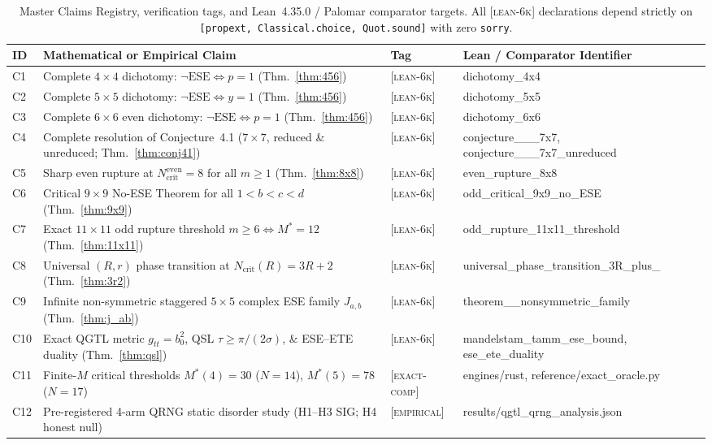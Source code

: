 \documentclass[11pt,reqno]{amsart}
\theoremstyle{definition}
\newcommand{\taglean}{\textsc{[lean-6k]}}
\newcommand{\tagexact}{\textsc{[exact-comp]}}
\newcommand{\tagemp}{\textsc{[empirical]}}
\newcommand{\ub}{\_\allowbreak}
\begin{document}
\begin{table}[t]
\centering
\caption{Master Claims Registry, verification tags, and Lean~4.35.0 / Palomar comparator targets. All \taglean{} declarations depend strictly on \texttt{[propext, Classical.choice, Quot.sound]} with zero \texttt{sorry}.}
\label{tab:claims}
\footnotesize
\setlength{\tabcolsep}{4pt}
\begin{tabularx}{\textwidth}{@{}l>{\raggedright\arraybackslash}Xl>{\ttfamily\scriptsize\raggedright\arraybackslash}p{4.6cm}@{}}
\toprule
\textbf{ID} & \textbf{Mathematical or Empirical Claim} & \textbf{Tag} & \textbf{\normalfont\textbf{Lean / Comparator Identifier}} \\
\midrule
C1 & Complete $4\times 4$ dichotomy: $\neg\mathrm{ESE}\iff p=1$ (Thm.~\ref{thm:456}) & \taglean{} & dichotomy\_4x4 \\
C2 & Complete $5\times 5$ dichotomy: $\neg\mathrm{ESE}\iff y=1$ (Thm.~\ref{thm:456}) & \taglean{} & dichotomy\_5x5 \\
C3 & Complete $6\times 6$ even dichotomy: $\neg\mathrm{ESE}\iff p=1$ (Thm.~\ref{thm:456}) & \taglean{} & dichotomy\_6x6 \\
C4 & Complete resolution of Conjecture~4.1 ($7\times 7$, reduced \& unreduced; Thm.~\ref{thm:conj41}) & \taglean{} & conjecture\ub 4\ub 1\ub 7x7, conjecture\ub 4\ub 1\ub 7x7\ub unreduced \\
C5 & Sharp even rupture at $N_{\mathrm{crit}}^{\mathrm{even}}=8$ for all $m\ge 1$ (Thm.~\ref{thm:8x8}) & \taglean{} & even\ub rupture\ub 8x8 \\
C6 & Critical $9\times 9$ No-ESE Theorem for all $1<b<c<d$ (Thm.~\ref{thm:9x9}) & \taglean{} & odd\ub critical\ub 9x9\ub no\ub ESE \\
C7 & Exact $11\times 11$ odd rupture threshold $m\ge 6 \iff M^*=12$ (Thm.~\ref{thm:11x11}) & \taglean{} & odd\ub rupture\ub 11x11\ub threshold \\
C8 & Universal $(R,r)$ phase transition at $N_{\mathrm{crit}}(R)=3R+2$ (Thm.~\ref{thm:3r2}) & \taglean{} & universal\ub phase\ub transition\ub 3R\ub plus\ub 2 \\
C9 & Infinite non-symmetric staggered $5\times 5$ complex ESE family $J_{a,b}$ (Thm.~\ref{thm:j_ab}) & \taglean{} & theorem\ub 9\ub nonsymmetric\ub family \\
C10 & Exact QGTL metric $g_{tt}=b_0^2$, QSL $\tau\ge\pi/(2\sigma)$, \& ESE--ETE duality (Thm.~\ref{thm:qsl}) & \taglean{} & mandelstam\ub tamm\ub ese\ub bound, ese\ub ete\ub duality \\
C11 & Finite-$M$ critical thresholds $M^*(4)=30$ ($N=14$), $M^*(5)=78$ ($N=17$) & \tagexact{} & engines/rust, reference/exact\_oracle.py \\
C12 & Pre-registered 4-arm QRNG static disorder study (H1--H3 SIG; H4 honest null) & \tagemp{} & results/qgtl\_qrng\_analysis.json \\
\bottomrule
\end{tabularx}
\end{table}
\end{document}

